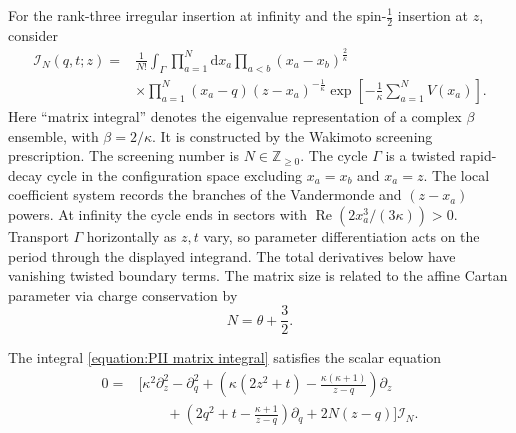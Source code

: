 \documentclass[a4paper,11pt]{article}
\newcommand{\dd}{\mathrm{d}}
\numberwithin{equation}{section}
\begin{document}
For the rank-three irregular insertion at infinity and the spin-$\frac{1}{2}$
insertion at $z$, consider
\begin{equation}
	\label{equation:PII matrix integral}
	\begin{aligned}
		\mathcal{I}_{N}(q,t;z)
		={}&\frac{1}{N!}\int_{\Gamma}
		\prod_{a=1}^{N}\dd x_{a}
		\prod_{a<b}(x_{a}-x_{b})^{\frac{2}{\kappa}}
		\\
		&\times\prod_{a=1}^{N}(x_{a}-q)(z-x_{a})^{-\frac{1}{\kappa}}
		\exp\left[-\frac{1}{\kappa}\sum_{a=1}^{N}V(x_{a})\right].
	\end{aligned}
\end{equation}
 Here ``matrix integral'' denotes the eigenvalue representation of a
complex $\beta$ ensemble, with $\beta=2/\kappa$.  It is constructed
by the Wakimoto screening prescription.  The screening
number is $N\in\mathbb{Z}_{\geq0}$.  The cycle $\Gamma$
is a twisted rapid-decay cycle in the configuration space excluding
$x_{a}=x_{b}$ and $x_{a}=z$.  The local coefficient system records the
branches of the Vandermonde and $(z-x_{a})$ powers.  At infinity the
cycle ends in sectors with
$\operatorname{Re}\left(2x_{a}^{3}/(3\kappa)\right)>0$.
Transport $\Gamma$ horizontally as $z,t$ vary, so parameter
differentiation acts on the period through the displayed integrand.
The total derivatives below have vanishing twisted boundary terms.
The matrix size is related to the affine
Cartan parameter via charge conservation by
\begin{equation}
	\label{equation:PII N theta relation}
	N=\theta+\frac{3}{2}.
\end{equation}

The integral \eqref{equation:PII matrix integral} satisfies the scalar equation
\begin{equation}
	\label{equation:PII matrix integral scalar equation}
	\begin{aligned}
		0={}&
		\Bigg[
		\kappa^{2}\partial_{z}^{2}
		-\partial_{q}^{2}
		+\left(
		\kappa(2z^{2}+t)
		-\frac{\kappa(\kappa+1)}{z-q}
		\right)\partial_{z}
		\\
		&\qquad
		+\left(
		2q^{2}+t
		-\frac{\kappa+1}{z-q}
		\right)\partial_{q}
		+2N(z-q)
		\Bigg]\mathcal{I}_{N}.
	\end{aligned}
\end{equation}
\end{document}
